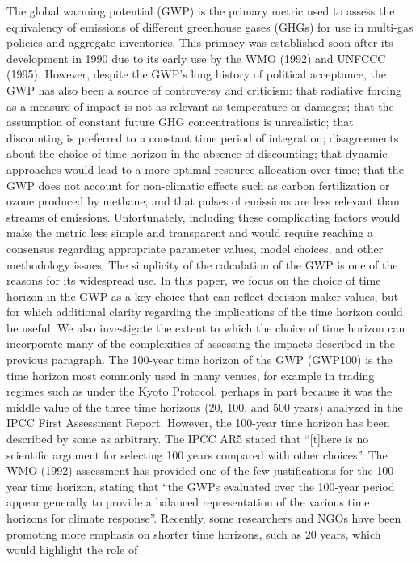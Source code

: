\documentclass[gc, manuscript]{copernicus}
\begin{document}
The global warming potential (GWP) is the primary metric used to assess
the equivalency of emissions of different greenhouse gases (GHGs) for
use in multi-gas policies and aggregate inventories. This primacy was
established soon after its development in 1990 due to its early use by
the WMO (1992) and UNFCCC (1995). However, despite the GWP's long
history of political acceptance, the GWP has also been a source of
controversy and criticism: that radiative forcing as a measure of impact
is not as relevant as temperature or damages; that the assumption of
constant future GHG concentrations is unrealistic; that discounting is
preferred to a constant time period of integration; disagreements about
the choice of time horizon in the absence of discounting; that dynamic
approaches would lead to a more optimal resource allocation over time;
that the GWP does not account for non-climatic effects such as carbon
fertilization or ozone produced by methane; and that pulses of emissions
are less relevant than streams of emissions. Unfortunately, including
these complicating factors would make the metric less simple and
transparent and would require reaching a consensus regarding appropriate
parameter values, model choices, and other methodology issues. The
simplicity of the calculation of the GWP is one of the reasons for its
widespread use. In this paper, we focus on the choice of time horizon in
the GWP as a key choice that can reflect decision-maker values, but for
which additional clarity regarding the implications of the time horizon
could be useful. We also investigate the extent to which the choice of
time horizon can incorporate many of the complexities of assessing the
impacts described in the previous paragraph. The 100-year time horizon
of the GWP (GWP100) is the time horizon most commonly used in many
venues, for example in trading regimes such as under the Kyoto Protocol,
perhaps in part because it was the middle value of the three time
horizons (20, 100, and 500 years) analyzed in the IPCC First Assessment
Report. However, the 100-year time horizon has been described by some as
arbitrary. The IPCC AR5 stated that ``{[}t{]}here is no scientific
argument for selecting 100 years compared with other choices''. The WMO
(1992) assessment has provided one of the few justifications for the
100-year time horizon, stating that ``the GWPs evaluated over the
100-year period appear generally to provide a balanced representation of
the various time horizons for climate response''. Recently, some
researchers and NGOs have been promoting more emphasis on shorter time
horizons, such as 20 years, which would highlight the role of
\end{document}
